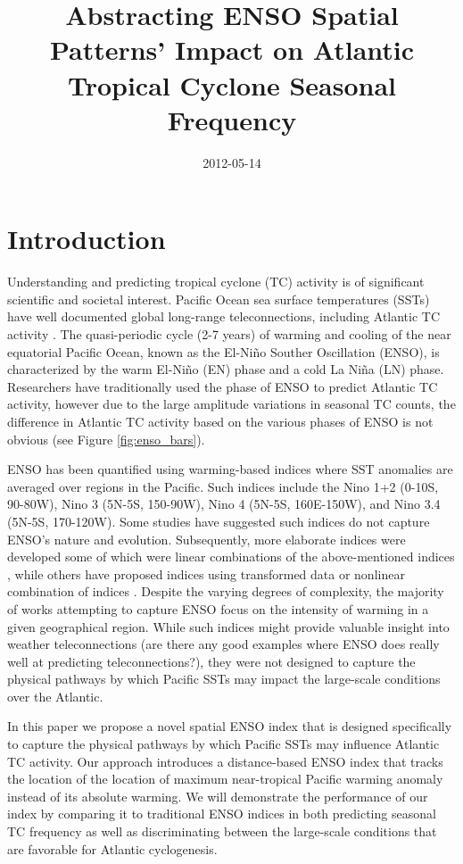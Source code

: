\documentclass[]{article}
\title{Abstracting ENSO Spatial Patterns' Impact on Atlantic Tropical Cyclone Seasonal Frequency}
\author{  }
\date{2012-05-14}
\begin{document}
\maketitle

\begin{abstract}
\end{abstract}
\section{Introduction}
Understanding and predicting tropical cyclone (TC) activity is of significant scientific and societal interest. Pacific Ocean sea surface temperatures (SSTs) have well documented global long-range teleconnections, including Atlantic TC activity \cite{gray1984a, bove1998,elsner2001b, emanuel2008, klotzbach2011nino}. The quasi-periodic cycle (2-7 years) of warming and cooling of the near equatorial Pacific Ocean, known as the El-Ni\~no Souther Oscillation (ENSO), is characterized by the warm El-Ni\~no (EN) phase and a cold La Ni\~na (LN) phase. Researchers have traditionally used the phase of ENSO to predict Atlantic TC activity, however due to the large amplitude variations in seasonal TC counts, the difference in Atlantic TC activity based on the various phases of ENSO is not obvious (see Figure \ref{fig:enso_bars}).

ENSO has been quantified using warming-based indices where SST anomalies are averaged over regions in the Pacific. Such indices include the Nino 1+2 (0-10S, 90-80W), Nino 3 (5N-5S, 150-90W), Nino 4 (5N-5S, 160E-150W), and Nino 3.4 (5N-5S, 170-120W). Some studies have suggested such indices do not capture ENSO's nature and evolution. Subsequently, more elaborate indices were developed some of which were linear combinations of the above-mentioned indices \cite{trenberth2001}, while others have proposed indices using transformed data or nonlinear combination of indices \cite{ren2011}. Despite the varying degrees of complexity, the majority of works attempting to capture ENSO focus on the intensity of warming in a given geographical region. While such indices might provide valuable insight into weather teleconnections (are there any good examples where ENSO does really well at predicting teleconnections?), they were not designed to capture the physical pathways by which Pacific SSTs may impact the large-scale conditions over the Atlantic.

In this paper we propose a novel spatial ENSO index that is designed specifically to capture the physical pathways by which Pacific SSTs may influence Atlantic TC activity. Our approach introduces a distance-based ENSO index that tracks the location of 
the location of maximum near-tropical Pacific warming anomaly instead of its absolute warming. We will demonstrate the performance of our index by comparing it to traditional ENSO indices in both predicting seasonal TC frequency as well as discriminating between the large-scale conditions that are favorable for Atlantic cyclogenesis.
\end{document}
